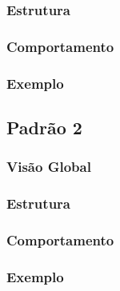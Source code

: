 \documentclass[11pt, a4paper]{article}
\begin{document}
		    \subsubsection{Estrutura}
		
		    \subsubsection{Comportamento}
		
		    \subsubsection{Exemplo}
		        
		\subsection{Padrão 2}
		
		    \subsubsection{Visão Global}
		
		    \subsubsection{Estrutura}
		
		    \subsubsection{Comportamento}
		
		    \subsubsection{Exemplo}
		        
\end{document}
